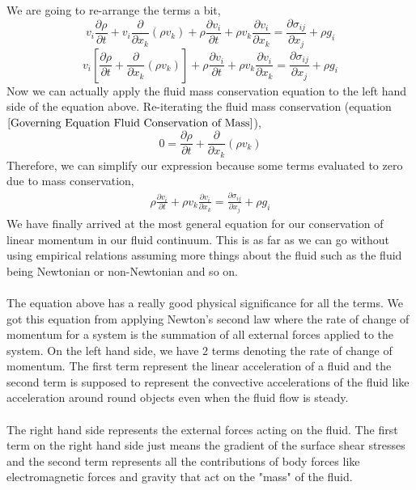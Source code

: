We are going to re-arrange the terms a bit,
$$v_{i}\frac{\partial \rho}{\partial t} + v_{i}\frac{\partial}{\partial x_{k}} (\rho v_{k}) + \rho\frac{\partial v_{i}}{\partial t} + \rho v_{k}\frac{\partial v_{i}}{\partial x_{k}} = \frac{\partial \sigma_{ij}}{\partial x_{j}}  +  \rho g_{i} $$
$$v_{i}\left[\frac{\partial \rho}{\partial t} + \frac{\partial}{\partial x_{k}} (\rho v_{k})\right] + \rho\frac{\partial v_{i}}{\partial t} + \rho v_{k}\frac{\partial v_{i}}{\partial x_{k}} = \frac{\partial \sigma_{ij}}{\partial x_{j}}  +  \rho g_{i} $$
Now we can actually apply the fluid mass conservation equation to the left hand side of the equation above.
Re-iterating the fluid mass conservation (equation $\ref{Governing Equation Fluid Conservation of Mass}$),
$$0 = \frac{\partial \rho}{\partial t} + \frac{\partial}{\partial x_{k}} (\rho v_{k}) $$
Therefore, we can simplify our expression because some terms evaluated to zero due to mass conservation,
\begin{eqnarray}
\rho\frac{\partial v_{i}}{\partial t} + \rho v_{k}\frac{\partial v_{i}}{\partial x_{k}} = \frac{\partial \sigma_{ij}}{\partial x_{j}}  +  \rho g_{i} 
\label{Conservation of Momentum Fluid General}
\end{eqnarray}
We have finally arrived at the most general equation for our conservation of linear momentum in our fluid continuum.
This is as far as we can go without using empirical relations assuming more things about the fluid such as the fluid being Newtonian or non-Newtonian and so on.
\\~\\The equation above has a really good physical significance for all the terms. 
We got this equation from applying Newton's second law where the rate of change of momentum for a system is the summation of all external forces applied to the system.
On the left hand side, we have $2$ terms denoting the rate of change of momentum.
The first term represent the linear acceleration of a fluid and the second term is supposed to represent the convective accelerations of the fluid like acceleration around round objects even when the fluid flow is steady.
\\~\\The right hand side represents the external forces acting on the fluid.
The first term on the right hand side just means the gradient of the surface shear stresses and the second term represents all the contributions of body forces like electromagnetic forces and gravity that act on the "mass" of the fluid.


